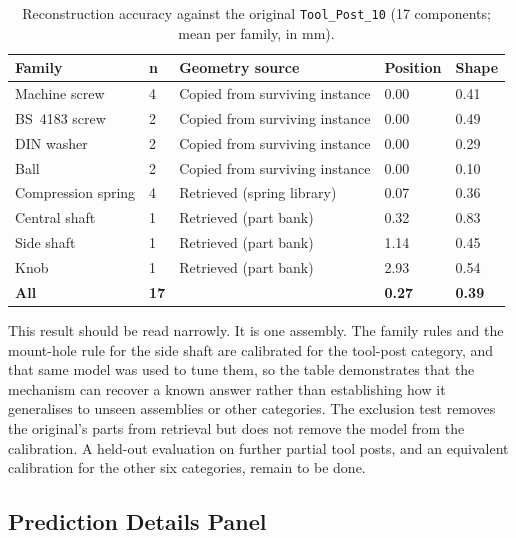 \documentclass[12pt,oneside,a4paper]{report}
\begin{document}
\begin{table}[H]
\centering
\caption{Reconstruction accuracy against the original \texttt{Tool\_Post\_10}
(17 components; mean per family, in mm).}
\label{tab:recon}
\small
\begin{tabularx}{\textwidth}{@{}L{3.3cm}C{0.9cm}L{5.5cm}C{1.9cm}C{1.9cm}@{}}
\toprule
\textbf{Family} & \textbf{n} & \textbf{Geometry source} & \textbf{Position} & \textbf{Shape} \\
\midrule
Machine screw      & 4 & Copied from surviving instance & 0.00 & 0.41 \\
BS~4183 screw      & 2 & Copied from surviving instance & 0.00 & 0.49 \\
DIN washer         & 2 & Copied from surviving instance & 0.00 & 0.29 \\
Ball               & 2 & Copied from surviving instance & 0.00 & 0.10 \\
Compression spring & 4 & Retrieved (spring library)     & 0.07 & 0.36 \\
Central shaft      & 1 & Retrieved (part bank)          & 0.32 & 0.83 \\
Side shaft         & 1 & Retrieved (part bank)          & 1.14 & 0.45 \\
Knob               & 1 & Retrieved (part bank)          & 2.93 & 0.54 \\
\midrule
\textbf{All}       & \textbf{17} & & \textbf{0.27} & \textbf{0.39} \\
\bottomrule
\end{tabularx}
\end{table}

This result should be read narrowly. It is one assembly. The family rules and
the mount-hole rule for the side shaft are calibrated for the tool-post
category, and that same model was used to tune them, so the table demonstrates
that the mechanism can recover a known answer rather than establishing how it
generalises to unseen assemblies or other categories. The exclusion test
removes the original's parts from retrieval but does not remove the model from
the calibration. A held-out evaluation on further partial tool posts, and an
equivalent calibration for the other six categories, remain to be done.

\subsection{Prediction Details Panel}
\end{document}

